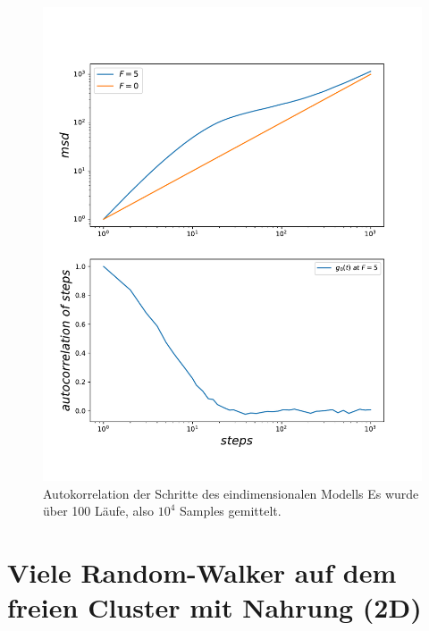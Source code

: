 \documentclass[a4paper, 12pt]{report}
\begin{document}
\begin{figure}[H]
	\centering
	\includegraphics[scale=0.7]{onedescp.pdf}
	\caption{Autokorrelation der Schritte des eindimensionalen Modells \break Es wurde über 100 Läufe, also $10^4$ Samples gemittelt.}
\end{figure}



\chapter{Viele Random-Walker auf dem freien Cluster mit Nahrung (2D)}
\end{document}
